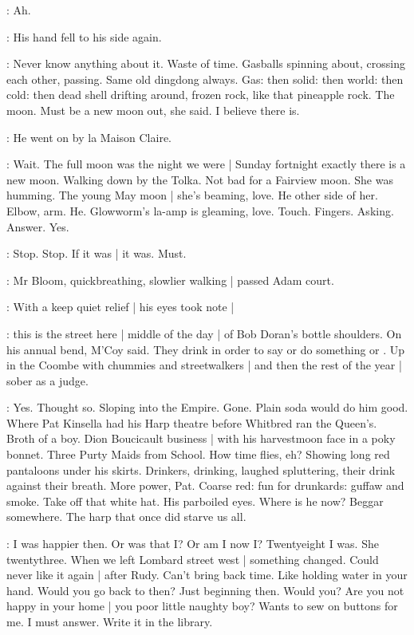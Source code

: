 \BloomInt:
Ah.

:
His hand fell to his side again.

\BloomInt:
Never know anything about it.
Waste of time.
Gasballs spinning about,
crossing each other,
passing.
Same old dingdong always.
Gas:
then solid:
then world:
then cold:
then dead shell drifting around,
frozen rock,
like that pineapple rock.
The moon.
Must be a new moon out,
she said.
I believe there is.

:
He went on by la Maison Claire.

\BloomInt:
Wait.
The full moon was the night we were |
Sunday fortnight exactly there is a new moon.
Walking down by the Tolka.
Not bad for a Fairview moon.
She was humming.
The young May moon |
she's beaming,
love.
He other side of her.
Elbow, arm.
He.
Glowworm's la-amp is gleaming, love.
Touch.
Fingers.
Asking.
Answer.
Yes.

\BloomInt:
Stop.
Stop.
If it was |
it was.
Must.

:
Mr Bloom,
quickbreathing,
slowlier walking |
passed Adam court.

:
With a keep quiet relief |
his eyes took note |

\BloomInt:
this is the street here |
middle of the day |
of Bob Doran's bottle shoulders.
On his annual bend,
M'Coy said.
They drink in order to say or do something
or .
Up in the Coombe with chummies and streetwalkers |
and then the rest of the year |
sober as a judge.

\BloomInt:
Yes.
Thought so.
Sloping into the Empire.
Gone.
Plain soda would do him good.
Where Pat Kinsella had his Harp theatre
before Whitbred ran the Queen's.
Broth of a boy.
Dion Boucicault business |
with his harvestmoon face in a poky bonnet.
Three Purty Maids from School.
How time flies, eh?
Showing long red pantaloons under his skirts.
Drinkers, drinking, laughed spluttering,
their drink against their breath.
More power, Pat.
Coarse red:
fun for drunkards:
guffaw and smoke.
Take off that white hat.
His parboiled eyes.
Where is he now?
Beggar somewhere.
The harp that once did starve us all.

\BloomInt:
I was happier then.
Or was that I?
Or am I now I?
Twentyeight I was.
She twentythree.
When we left Lombard street west |
something changed.
Could never like it again |
after Rudy.
Can't bring back time.
Like holding water in your hand.
Would you go back to then?
Just beginning then.
Would you?
Are you not happy in your home |
you poor little naughty boy?
Wants to sew on buttons for me.
I must answer.
Write it in the library.

